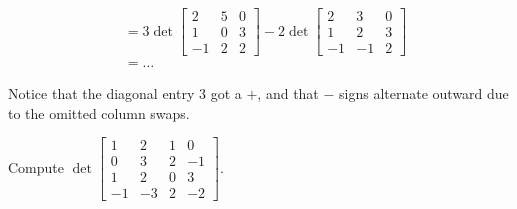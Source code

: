 \begin{applicationActivities}
\begin{observation}
\begin{align*}
&= 3 \det \begin{bmatrix}2 & 5 & 0 \\ 1 & 0 & 3 \\ -1 & 2 & 2 \end{bmatrix} -2 \det \begin{bmatrix} 2 & 3 & 0 \\ 1 & 2 & 3 \\ -1 & -1 & 2 \end{bmatrix} \\
&= \dots
\end{align*}

Notice that the diagonal entry \(3\) got a \(+\), and that \(-\)
signs alternate outward due to the omitted column swaps.
  \end{observation}

\begin{activity}{10}
  Compute 
  \(
    \det\begin{bmatrix} 
      1 & 2 & 1 & 0 \\ 
      0 & 3 & 2 & -1 \\ 
      1 & 2 & 0 & 3 \\ 
      -1 & -3 & 2 & -2 
    \end{bmatrix}
  \).
\end{activity}


\end{applicationActivities}
